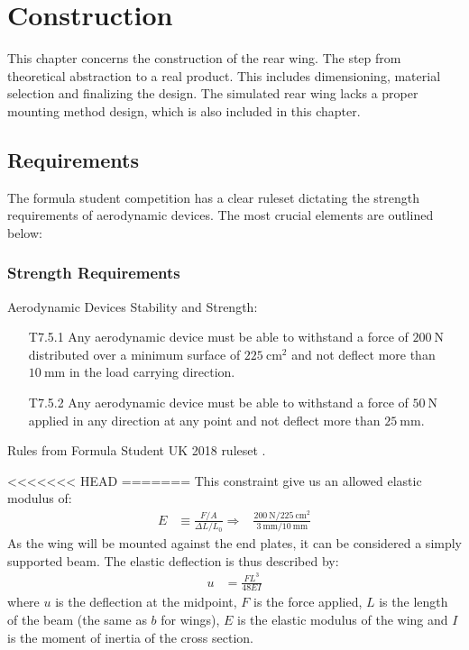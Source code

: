 \chapter{Construction}

  This chapter concerns the construction of the rear wing. The step from theoretical abstraction to a real product. This includes dimensioning, material selection and finalizing the design. The simulated rear wing lacks a proper mounting method design, which is also included in this chapter.

\section{Requirements}

  The formula student competition has a clear ruleset dictating the strength requirements of aerodynamic devices. The most crucial elements are outlined below:

  \subsection{Strength Requirements}
    \begin{tcolorbox}[colframe=seapurple,colback=seapurple!1]
      Aerodynamic Devices Stability and Strength:
      \begin{itemize}
        \item [T7.5.1] Any aerodynamic device must be able to withstand a force of $\SI{200}{\newton}$ distributed over a minimum surface of $\SI{225}{\centi\metre\squared}$ and not deflect more than $\SI{10}{\milli\metre}$ in the load carrying direction.
        \item [T7.5.2] Any aerodynamic device must be able to withstand a force of $\SI{50}{\newton}$ applied in any direction at any point and not deflect more than $\SI{25}{\milli\metre}$.
      \end{itemize}

      \hspace*{\fill}\tiny{Rules from Formula Student UK 2018 ruleset \cite{FSrules18}.}
    \end{tcolorbox}

<<<<<<< HEAD
=======
    This constraint give us an allowed elastic modulus of:
    \begin{align}
      E &\equiv \frac{F/A}{\Delta L/{L_0}}
      \Rightarrow&
      \frac{\SI{200}{\newton}
      /
      \SI{225}{\centi\metre\squared}}
      {\SI{3}{\milli\metre}/\SI{10}{\milli\metre}}
    \end{align}
    As the wing will be mounted against the end plates, it can be considered a simply supported beam. The elastic deflection is thus described by:
    \begin{align}
      u &= \frac{FL^3}{48EI}
    \end{align}
    where $u$ is the deflection at the midpoint, $F$ is the force applied, $L$ is the length of the beam (the same as $b$ for wings), $E$ is the elastic modulus of the wing and $I$ is the moment of inertia of the cross section.

